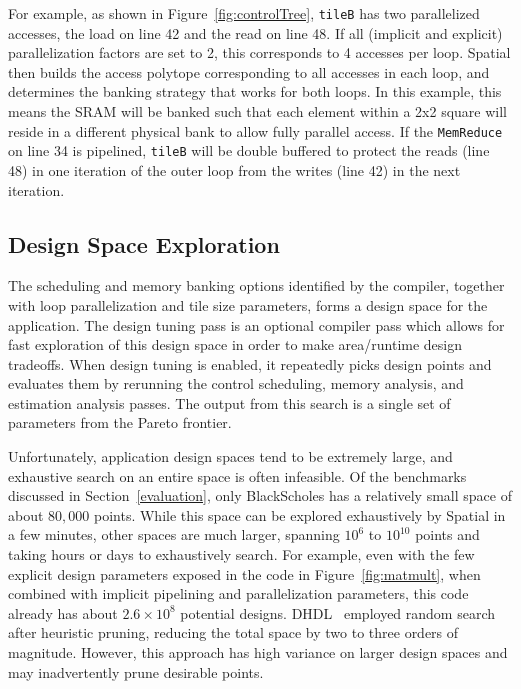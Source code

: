 {For example, as shown in Figure~\ref{fig:controlTree}, \texttt{\small{tileB}} has two parallelized accesses, the load on line 42 and the read on line 48. If all (implicit and explicit) parallelization factors are set to 2, this corresponds to 4 accesses per loop. Spatial then builds the access polytope corresponding to all accesses in each loop, and determines the banking strategy that works for both loops. In this example, this means the SRAM will be banked such that each element within a 2x2 square will reside
in a different physical bank to allow fully parallel access. If the \texttt{\small{MemReduce}} on line 34 is pipelined, \texttt{\small{tileB}} will be double buffered to protect the reads (line 48) in one iteration of the outer loop
from the writes (line 42) in the next iteration.







\subsection{Design Space Exploration}
\label{dse}
The scheduling and memory banking options identified by the compiler, together with loop parallelization and tile size parameters, forms a design space for the application. 
The design tuning pass is an optional compiler pass which allows for fast exploration of this design space in order to make area/runtime design tradeoffs.
When design tuning is enabled, it repeatedly picks design points and evaluates them by rerunning the control scheduling, memory analysis, and estimation analysis passes. The output from this search is a single set of parameters from the Pareto frontier.


Unfortunately, application design spaces tend to be extremely large, and exhaustive search on an entire space is often infeasible. Of the benchmarks discussed in Section~\ref{evaluation}, 
only BlackScholes has a relatively small space of about $80,000$ points. While this space can be explored exhaustively by Spatial in a few minutes, other spaces are much larger, spanning $10^6$ to $10^{10}$ points and
taking hours or days to exhaustively search. For example, even with the few explicit design parameters exposed in the code in Figure~\ref{fig:matmult}, when combined with implicit pipelining and parallelization parameters, this code already has about $2.6\times10^8$ potential designs.
DHDL~\cite{dhdl} employed random search after heuristic pruning, reducing the total space by two to three orders of magnitude. However, this approach has high variance on larger design spaces and may inadvertently prune desirable points.

}
